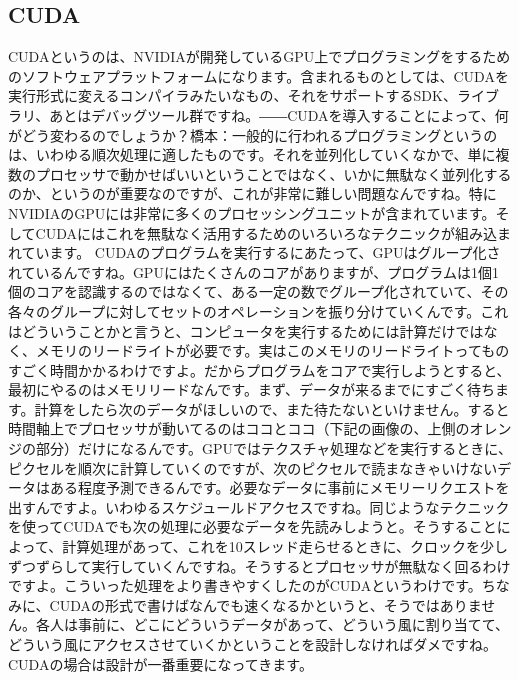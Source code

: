 \subsection{CUDA}
CUDAというのは、NVIDIAが開発しているGPU上でプログラミングをするためのソフトウェアプラットフォームになります。含まれるものとしては、CUDAを実行形式に変えるコンパイラみたいなもの、それをサポートするSDK、ライブラリ、あとはデバッグツール群ですね。――CUDAを導入することによって、何がどう変わるのでしょうか？橋本：一般的に行われるプログラミングというのは、いわゆる順次処理に適したものです。それを並列化していくなかで、単に複数のプロセッサで動かせばいいということではなく、いかに無駄なく並列化するのか、というのが重要なのですが、これが非常に難しい問題なんですね。特にNVIDIAのGPUには非常に多くのプロセッシングユニットが含まれています。そしてCUDAにはこれを無駄なく活用するためのいろいろなテクニックが組み込まれています。
CUDAのプログラムを実行するにあたって、GPUはグループ化されているんですね。GPUにはたくさんのコアがありますが、プログラムは1個1個のコアを認識するのではなくて、ある一定の数でグループ化されていて、その各々のグループに対してセットのオペレーションを振り分けていくんです。これはどういうことかと言うと、コンピュータを実行するためには計算だけではなく、メモリのリードライトが必要です。実はこのメモリのリードライトってものすごく時間かかるわけですよ。だからプログラムをコアで実行しようとすると、最初にやるのはメモリリードなんです。まず、データが来るまでにすごく待ちます。計算をしたら次のデータがほしいので、また待たないといけません。すると時間軸上でプロセッサが動いてるのはココとココ（下記の画像の、上側のオレンジの部分）だけになるんです。GPUではテクスチャ処理などを実行するときに、ピクセルを順次に計算していくのですが、次のピクセルで読まなきゃいけないデータはある程度予測できるんです。必要なデータに事前にメモリーリクエストを出すんですよ。いわゆるスケジュールドアクセスですね。同じようなテクニックを使ってCUDAでも次の処理に必要なデータを先読みしようと。そうすることによって、計算処理があって、これを10スレッド走らせるときに、クロックを少しずつずらして実行していくんですね。そうするとプロセッサが無駄なく回るわけですよ。こういった処理をより書きやすくしたのがCUDAというわけです。ちなみに、CUDAの形式で書けばなんでも速くなるかというと、そうではありません。各人は事前に、どこにどういうデータがあって、どういう風に割り当てて、どういう風にアクセスさせていくかということを設計しなければダメですね。CUDAの場合は設計が一番重要になってきます。
\newpage
